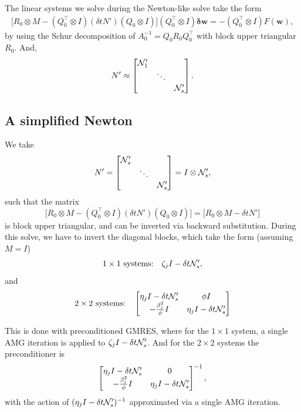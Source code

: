 \documentclass[review]{siamart}
\begin{document}
The linear systems we solve during the Newton-like solve take the form
\begin{align}
\big[ R_0 \otimes M - (Q_0^\top \otimes  I) (\delta t N')  (Q_0 \otimes I) \big] 
(Q_0^\top \otimes I) \bm{ \delta w } = - (Q_0^\top \otimes I) F( \bm{w}),
\end{align}
by using the Schur decomposition of $A^{-1}_0 = Q_0  R_0 Q^{\top}_0$ with block upper triangular $R_0$. And, 
\begin{align}
N' \approx  
\begin{bmatrix} {\cal N}'_1 \\ 
& \ddots \\ 
& & {\cal N}'_s
\end{bmatrix}.
\end{align}

\subsection{A simplified Newton}
We take
\begin{align}
N' = 
\begin{bmatrix} {\cal N}'_s \\ 
& \ddots \\ 
& & {\cal N}'_s
\end{bmatrix}
= 
I \otimes {\cal N}'_s,
\end{align}
such that the matrix 
\[\big[ R_0 \otimes M - (Q_0^\top \otimes  I) (\delta t N')  (Q_0 \otimes I) \big] = 
\big[ R_0 \otimes M - \delta t N' \big] \] is block upper triangular, and can be inverted via backward substitution. During this solve, we have to invert the diagonal blocks, which take the form (assuming  $M = I$)
\begin{align}
1 \times 1 \textrm{ systems:} \quad \zeta_j I - \delta t {\cal N}'_s,
\end{align}
and 
\begin{align}
2 \times 2 \textrm{ systems:} \quad
\begin{bmatrix}
\eta_jI  - \delta t {\cal N}'_s & \phi I \\
-\tfrac{\beta^2_j}{\phi}I & \eta_jI  - \delta t {\cal N}'_s \\
\end{bmatrix}
\end{align}

This is done with preconditioned GMRES, where for the $1 \times 1$ system, a single AMG iteration is applied to $\zeta_j I - \delta t {\cal N}'_s$. And for the 
$2 \times 2$ systems the preconditioner is 
\begin{align}
\begin{bmatrix}
\eta_jI  - \delta t {\cal N}'_s & 0 \\
-\tfrac{\beta^2_j}{\phi}I & \eta_jI  - \delta t {\cal N}'_s \\
\end{bmatrix}^{-1},
\end{align}
with the action of $(\eta_jI  - \delta t {\cal N}'_s)^{-1}$ approximated via a single AMG iteration.
\end{document}
